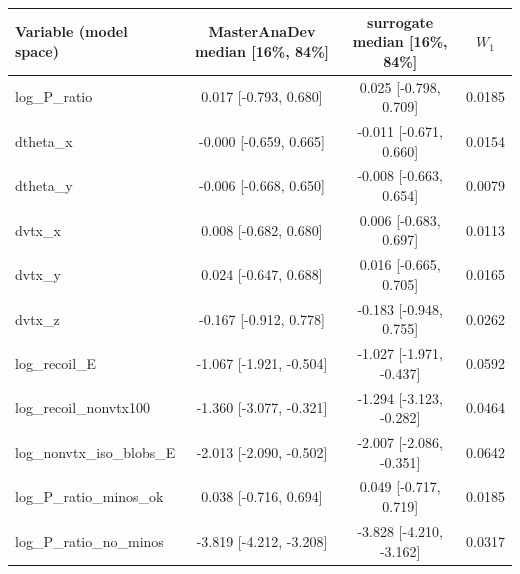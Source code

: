 \begin{tabular}{lccc}
\toprule
Variable (model space) & MasterAnaDev median [16\%, 84\%] & surrogate median [16\%, 84\%] & $W_1$ \\
\midrule
log\_P\_ratio & 0.017 [-0.793, 0.680] & 0.025 [-0.798, 0.709] & 0.0185 \\
dtheta\_x & -0.000 [-0.659, 0.665] & -0.011 [-0.671, 0.660] & 0.0154 \\
dtheta\_y & -0.006 [-0.668, 0.650] & -0.008 [-0.663, 0.654] & 0.0079 \\
dvtx\_x & 0.008 [-0.682, 0.680] & 0.006 [-0.683, 0.697] & 0.0113 \\
dvtx\_y & 0.024 [-0.647, 0.688] & 0.016 [-0.665, 0.705] & 0.0165 \\
dvtx\_z & -0.167 [-0.912, 0.778] & -0.183 [-0.948, 0.755] & 0.0262 \\
log\_recoil\_E & -1.067 [-1.921, -0.504] & -1.027 [-1.971, -0.437] & 0.0592 \\
log\_recoil\_nonvtx100 & -1.360 [-3.077, -0.321] & -1.294 [-3.123, -0.282] & 0.0464 \\
log\_nonvtx\_iso\_blobs\_E & -2.013 [-2.090, -0.502] & -2.007 [-2.086, -0.351] & 0.0642 \\
log\_P\_ratio\_minos\_ok & 0.038 [-0.716, 0.694] & 0.049 [-0.717, 0.719] & 0.0185 \\
log\_P\_ratio\_no\_minos & -3.819 [-4.212, -3.208] & -3.828 [-4.210, -3.162] & 0.0317 \\
\bottomrule
\end{tabular}
